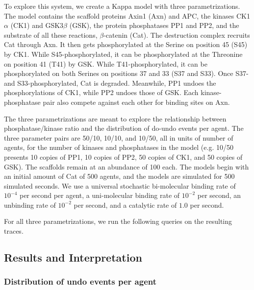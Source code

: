 To explore this system, we create a Kappa model with three
parametrizations. The model contains the scaffold proteins Axin1 (Axn)
and APC, the kinases CK1$\alpha$ (CK1) and GSK3$\beta$ (GSK), the
protein phosphatases PP1 and PP2, and the substrate of all these
reactions, $\beta$-catenin (Cat). The destruction complex recruits
Cat through Axn. It then gets phosphorylated at the Serine on position
45 (S45) by CK1. While S45-phosphorylated, it can be phosphorylated at
the Threonine on position 41 (T41) by GSK. While T41-phosphorylated,
it can be phosphorylated on both Serines on positions 37 and 33 (S37 and
S33). Once S37- and S33-phosphorylated, Cat is degraded. Meanwhile, PP1
undoes the phosphorylations of CK1, while PP2 undoes those of GSK. Each
kinase-phosphatase pair also compete against each other for binding sites
on Axn.

The three parametrizations are meant to explore the relationship
between phosphatase/kinase ratio and the distribution of do-undo
events per agent. The three parameter pairs are 50/10, 10/10, and
10/50, all in units of number of agents, for the number of kinases and
phosphatases in the model (e.g. 10/50 presents 10 copies of PP1, 10
copies of PP2, 50 copies of CK1, and 50 copies of GSK). The scaffolds
remain at an abundance of 100 each. The models begin with an initial
amount of Cat of 500 agents, and the models are simulated for 500
simulated seconds. We use a universal stochastic bi-molecular binding
rate of $10^{-4}$ per second per agent, a uni-molecular binding rate
of $10^{-2}$ per second, an unbinding rate of $10^{-2}$ per second,
and a catalytic rate of $1.0$ per second. 

For all three parametrizations, we run the following queries on the
resulting traces.



\subsection{Results and Interpretation}

\subsubsection*{Distribution of undo events per agent}

